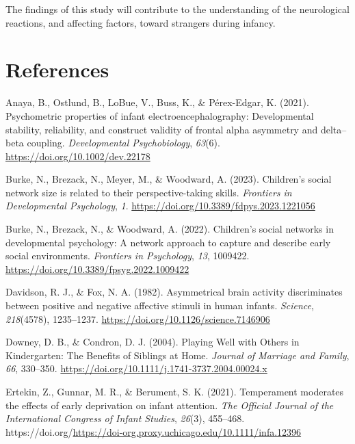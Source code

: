 \documentclass[
  man,
  floatsintext,
  longtable,
  nolmodern,
  notxfonts,
  notimes,
  colorlinks=true,linkcolor=blue,citecolor=blue,urlcolor=blue]{apa7}
\newlength{\cslhangindent}
\newenvironment{CSLReferences}[2] %
 {\begin{list}{}{%
  \setlength{\itemindent}{0pt}
  \setlength{\leftmargin}{0pt}
  \setlength{\parsep}{0pt}
  \ifodd #1
   \setlength{\leftmargin}{\cslhangindent}
   \setlength{\itemindent}{-1\cslhangindent}
  \fi
  \setlength{\itemsep}{#2\baselineskip}}}
 {\end{list}}
\begin{document}
The findings of this study will contribute to the understanding of the
neurological reactions, and affecting factors, toward strangers during
infancy.

\clearpage

\section{References}\label{sec-references}

\label{refs}
\begin{CSLReferences}{1}{0}
Anaya, B., Ostlund, B., LoBue, V., Buss, K., \& Pérex-Edgar, K. (2021).
Psychometric properties of infant electroencephalography:
{Developmental} stability, reliability, and construct validity of
frontal alpha asymmetry and delta--beta coupling. \emph{Developmental
Psychobiology}, \emph{63}(6). \url{https://doi.org/10.1002/dev.22178}

Burke, N., Brezack, N., Meyer, M., \& Woodward, A. (2023). Children's
social network size is related to their perspective-taking skills.
\emph{Frontiers in Developmental Psychology}, \emph{1}.
\url{https://doi.org/10.3389/fdpys.2023.1221056}

Burke, N., Brezack, N., \& Woodward, A. (2022). Children's social
networks in developmental psychology: {A} network approach to capture
and describe early social environments. \emph{Frontiers in Psychology},
\emph{13}, 1009422. \url{https://doi.org/10.3389/fpsyg.2022.1009422}

Davidson, R. J., \& Fox, N. A. (1982). Asymmetrical brain activity
discriminates between positive and negative affective stimuli in human
infants. \emph{Science}, \emph{218}(4578), 1235--1237.
\url{https://doi.org/10.1126/science.7146906}

Downey, D. B., \& Condron, D. J. (2004). Playing {Well} with {Others} in
{Kindergarten}: {The Benefits} of {Siblings} at {Home}. \emph{Journal of
Marriage and Family}, \emph{66}, 330--350.
\url{https://doi.org/10.1111/j.1741-3737.2004.00024.x}

Ertekin, Z., Gunnar, M. R., \& Berument, S. K. (2021). Temperament
moderates the effects of early deprivation on infant attention.
\emph{The Official Journal of the International Congress of Infant
Studies}, \emph{26}(3), 455--468.
https://doi.org/\url{https://doi-org.proxy.uchicago.edu/10.1111/infa.12396}


\end{CSLReferences}
\end{document}
